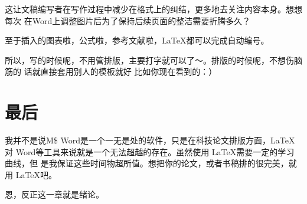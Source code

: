 这让文稿编写者在写作过程中减少在格式上的纠结，更多地去关注内容本身。想想每次
在Word上调整图片后为了保持后续页面的整洁需要折腾多久？

至于插入的图表啦，公式啦，参考文献啦，\LaTeX 都可以完成自动编号。

所以，写的时候呢，不用管排版，主要打字就可以了～。排版的时候呢，不想伤脑筋的
话就直接套用别人的模板就好 \pozhehao 比如你现在看到的：）

\section{最后}
我并不是说M\$ Word是一个一无是处的软件，只是在科技论文排版方面，\LaTeX 对
Word等工具来说就是一个无法超越的存在。虽然使用 \LaTeX 需要一定的学习曲线，但
是我保证这些时间物超所值。想把你的论文，或者书稿排的很完美，就用 \LaTeX 吧。

恩，反正这一章就是绪论。

